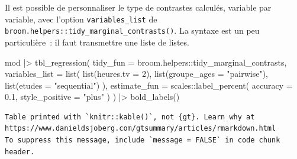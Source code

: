 \documentclass[
  letterpaper,
  DIV=11,
  numbers=noendperiod,
  oneside]{scrreprt}
\newenvironment{Shaded}{\begin{snugshade}}{\end{snugshade}}
\newcommand{\AttributeTok}[1]{\textcolor[rgb]{0.40,0.45,0.13}{#1}}
\newcommand{\DecValTok}[1]{\textcolor[rgb]{0.68,0.00,0.00}{#1}}
\newcommand{\FloatTok}[1]{\textcolor[rgb]{0.68,0.00,0.00}{#1}}
\newcommand{\FunctionTok}[1]{\textcolor[rgb]{0.28,0.35,0.67}{#1}}
\newcommand{\NormalTok}[1]{\textcolor[rgb]{0.00,0.23,0.31}{#1}}
\newcommand{\SpecialCharTok}[1]{\textcolor[rgb]{0.37,0.37,0.37}{#1}}
\newcommand{\StringTok}[1]{\textcolor[rgb]{0.13,0.47,0.30}{#1}}
\begin{document}
\begin{tcolorbox}[enhanced jigsaw, colbacktitle=quarto-callout-tip-color!10!white, opacityback=0, toprule=.15mm, colback=white, coltitle=black, bottomtitle=1mm, toptitle=1mm, titlerule=0mm, rightrule=.15mm, title=\textcolor{quarto-callout-tip-color}{\faLightbulb}\hspace{0.5em}{Astuce}, breakable, bottomrule=.15mm, opacitybacktitle=0.6, arc=.35mm, left=2mm, leftrule=.75mm, colframe=quarto-callout-tip-color-frame]

Il est possible de personnaliser le type de contrastes calculés,
variable par variable, avec l'option \texttt{variables\_list} de
\texttt{broom.helpers::tidy\_marginal\_contrasts()}. La syntaxe est un
peu particulière~: il faut transmettre une liste de listes.

\begin{Shaded}
\begin{Highlighting}[]
\NormalTok{mod }\SpecialCharTok{|\textgreater{}} 
  \FunctionTok{tbl\_regression}\NormalTok{(}
    \AttributeTok{tidy\_fun =}\NormalTok{ broom.helpers}\SpecialCharTok{::}\NormalTok{tidy\_marginal\_contrasts,}
    \AttributeTok{variables\_list =} \FunctionTok{list}\NormalTok{(}
      \FunctionTok{list}\NormalTok{(}\AttributeTok{heures.tv =} \DecValTok{2}\NormalTok{),}
      \FunctionTok{list}\NormalTok{(}\AttributeTok{groupe\_ages =} \StringTok{"pairwise"}\NormalTok{),}
      \FunctionTok{list}\NormalTok{(}\AttributeTok{etudes =} \StringTok{"sequential"}\NormalTok{)}
\NormalTok{    ),}
    \AttributeTok{estimate\_fun =}\NormalTok{ scales}\SpecialCharTok{::}\FunctionTok{label\_percent}\NormalTok{(}
      \AttributeTok{accuracy =} \FloatTok{0.1}\NormalTok{,}
      \AttributeTok{style\_positive =} \StringTok{"plus"}
\NormalTok{    )}
\NormalTok{  ) }\SpecialCharTok{|\textgreater{}} 
  \FunctionTok{bold\_labels}\NormalTok{()}
\end{Highlighting}
\end{Shaded}

\begin{verbatim}
Table printed with `knitr::kable()`, not {gt}. Learn why at
https://www.danieldsjoberg.com/gtsummary/articles/rmarkdown.html
To suppress this message, include `message = FALSE` in code chunk header.
\end{verbatim}


\end{tcolorbox}
\end{document}
